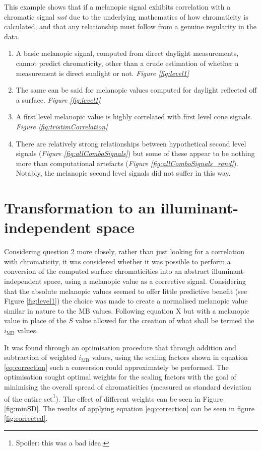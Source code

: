 This example shows that if a melanopic signal exhibits correlation with a chromatic signal \emph{not} due to the underlying mathematics of how chromaticity is calculated, and that any relationship must follow from a genuine regularity in the data.

\begin{enumerate}
   \item A basic melanopic signal, computed from direct daylight measurements, cannot predict chromaticity, other than a crude estimation of whether a measurement is direct sunlight or not. \emph{Figure \ref{fig:level1}}
    \item The same can be said for melanopic values computed for daylight reflected off a surface. \emph{Figure \ref{fig:level1}}
    \item A first level melanopic value is highly correlated with first level cone signals. \emph{Figure \ref{fig:tristimCorrelation}}
    \item There are relatively strong relationships between hypothetical second level signals (\emph{Figure \ref{fig:allComboSignals}}) but some of these appear to be nothing more than computational artefacts (\emph{Figure \ref{fig:allComboSignals_rand}}). Notably, the melanopic second level signals did not suffer in this way.
\end{enumerate}

\section{Transformation to an illuminant-independent space}

Considering question 2 more closely, rather than just looking for a correlation with chromaticity, it was considered whether it was possible to perform a conversion of the computed surface chromaticities into an abstract illuminant-independent space, using a melanopic value as a corrective signal. Considering that the absolute melanopic values seemed to offer little predictive benefit (see Figure \ref{fig:level1}) the choice was made to create a normalised melanopic value similar in nature to the MB values. Following equation X %
but with a melanopic value in place of the $S$ value allowed for the creation of what shall be termed the $i_{\text{MB}}$ values.

It was found through an optimisation procedure that through addition and subtraction of weighted $i_{\text{MB}}$ values, using the scaling factors shown in equation \ref{eq:correction} such a conversion could approximately be performed. The optimisation sought optimal weights for the scaling factors with the goal of minimising the overall spread of chromaticities (measured as standard deviation of the entire set\footnote{Spoiler: this was a bad idea.}). The effect of different weights can be seen in Figure \ref{fig:minSD}. The results of applying equation \ref{eq:correction} can be seen in figure \ref{fig:corrected}.

